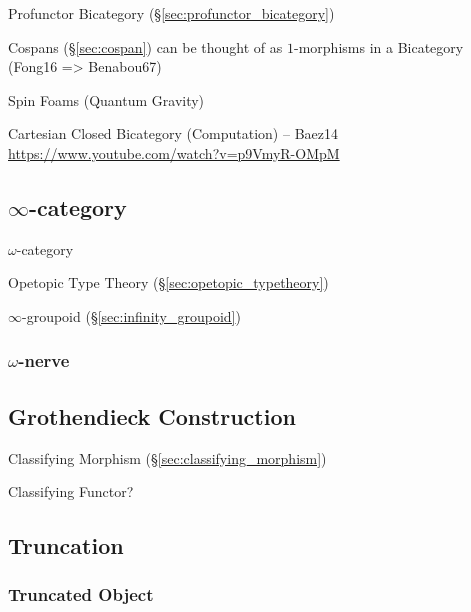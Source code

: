 Profunctor Bicategory (\S\ref{sec:profunctor_bicategory})

Cospans (\S\ref{sec:cospan}) can be thought of as $1$-morphisms in a
Bicategory (Fong16 => Benabou67)

Spin Foams (Quantum Gravity)

Cartesian Closed Bicategory (Computation) -- Baez14
\url{https://www.youtube.com/watch?v=p9VmyR-OMpM}



\subsection{$\infty$-category}\label{sec:infinity_category}

$\omega$-category

Opetopic Type Theory (\S\ref{sec:opetopic_typetheory})

\fist $\infty$-groupoid (\S\ref{sec:infinity_groupoid})



\subsubsection{$\omega$-nerve}\label{sec:omega_nerve}



\subsection{Grothendieck Construction}
\label{sec:grothendieck_construction}

Classifying Morphism (\S\ref{sec:classifying_morphism})

Classifying Functor?



\subsection{Truncation}\label{sec:truncation}

\subsubsection{Truncated Object}\label{sec:truncated_object}

